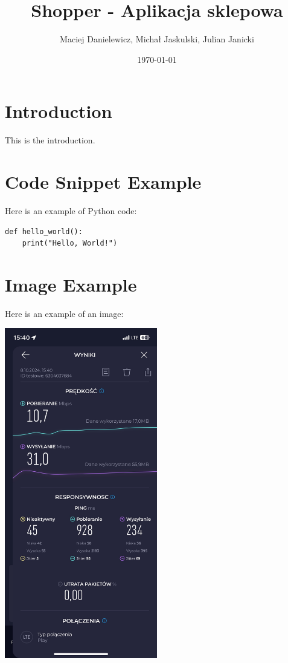 \documentclass{article}
\begin{document}
\title{Shopper - Aplikacja sklepowa}
\author{Maciej Danielewicz, Michał Jaskulski, Julian Janicki}
\date{\today}
\maketitle

\section{Introduction}
This is the introduction.

\section{Code Snippet Example}
Here is an example of Python code:

\begin{verbatim}
def hello_world():
    print("Hello, World!")
\end{verbatim}

\section{Image Example}
Here is an example of an image:

\includegraphics[width=0.5\textwidth]{./images/example.jpeg}
\end{document}
